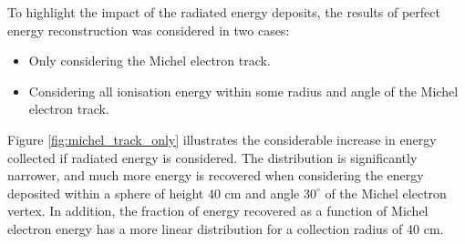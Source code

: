 To highlight the impact of the radiated energy deposits, the results of perfect
energy reconstruction was considered in two cases:
\begin{itemize}
	\item Only considering the Michel electron track.
	\item Considering all ionisation energy within some radius and angle of the
		Michel electron track.
\end{itemize}
Figure \ref{fig:michel_track_only} illustrates the considerable increase in
energy collected if radiated energy is considered. The distribution is
significantly narrower, and much more energy is recovered when considering the
energy deposited within a sphere of height $40\mbox{ cm}$ and angle
$30^\circ$ of the Michel electron vertex. In addition, the fraction of energy
recovered as a function of Michel electron energy has a more linear
distribution for a collection radius of 40 cm.

